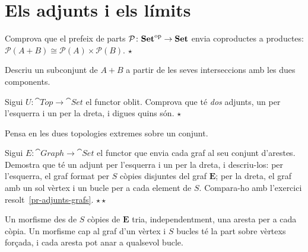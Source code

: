 \section{Els adjunts i els límits}

\begin{exercici}
Comprova que el prefeix de parts $\mathcal P\colon\mathbf{Set}^{\mathrm{op}}\to\mathbf{Set}$ envia coproductes a productes: $\mathcal P(A+B)\cong\mathcal P(A)\times\mathcal P(B)$. \hfill{\normalfont$\star$}
\begin{indicacio}
Descriu un subconjunt de $A+B$ a partir de les seves interseccions amb les dues components.
\end{indicacio}
\end{exercici}

\begin{exercici}
Sigui $U\colon\cat{Top}\to\cat{Set}$ el functor oblit. Comprova que té \emph{dos} adjunts, un per l'esquerra i un per la dreta, i digues quins són. \hfill{\normalfont$\star$}
\begin{indicacio}
Pensa en les dues topologies extremes sobre un conjunt.
\end{indicacio}
\end{exercici}

\begin{exercici}
Sigui $E\colon\cat{Graph}\to\cat{Set}$ el functor que envia cada graf al seu conjunt d'arestes. Demostra que té un adjunt per l'esquerra i un per la dreta, i descriu-los: per l'esquerra, el graf format per $S$ còpies disjuntes del graf $\mathbf E$; per la dreta, el graf amb un sol vèrtex i un bucle per a cada element de $S$. Compara-ho amb l'exercici resolt~\ref{pr-adjunts-grafs}. \hfill{\normalfont$\star\star$}
\begin{indicacio}
Un morfisme des de $S$ còpies de $\mathbf E$ tria, independentment, una aresta per a cada còpia. Un morfisme cap al graf d'un vèrtex i $S$ bucles té la part sobre vèrtexs forçada, i cada aresta pot anar a qualsevol bucle.
\end{indicacio}
\end{exercici}

